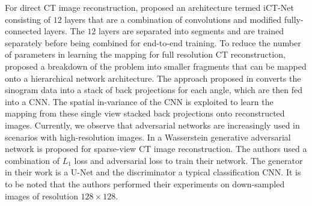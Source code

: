 For direct \ac{CT} image reconstruction, \cite{li2019learning} proposed an architecture termed iCT-Net consisting of $12$ layers that are a combination of convolutions and modified fully-connected layers. The $12$ layers are separated into segments and are trained separately before being combined for end-to-end training. To reduce the number of parameters in learning the mapping for full resolution \ac{CT} reconstruction, \cite{fu2019hierarchical} proposed a breakdown of the problem into smaller fragments that can be mapped onto a hierarchical network architecture. The approach proposed in \cite{ye2018deep} converts the sinogram data into a stack of back projections for each angle, which are then fed into a \ac{CNN}. The spatial in-variance of the \ac{CNN} is exploited to learn the mapping from these single view stacked back projections onto reconstructed images. Currently, we observe that adversarial networks are increasingly used in scenarios with high-resolution images. In \cite{thaler2018sparse} a Wasserstein generative adversarial network \cite{arjovsky2017wasserstein} is proposed for sparse-view \ac{CT} image reconstruction. The authors used a combination of $L_1$ loss and adversarial loss to train their network. The generator in their work is a U-Net and the discriminator a typical classification \ac{CNN}. It is to be noted that the authors performed their experiments on down-sampled images of resolution $128\times 128$. 




